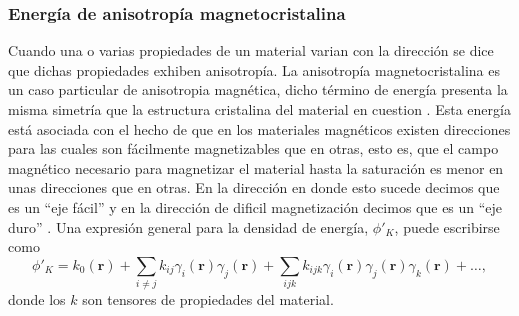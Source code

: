 \subsubsection{Energía de anisotropía magnetocristalina}
Cuando una o varias propiedades de un material varian con la dirección se dice que dichas propiedades exhiben anisotropía. La anisotropía magnetocristalina es un caso particular de anisotropia magnética, dicho término de energía presenta la misma simetría que la estructura cristalina del material en cuestion \cite{KronmüllerMicromagnetism}. Esta energía está asociada con el hecho de que en los materiales magnéticos existen direcciones para las cuales son fácilmente magnetizables que en otras, esto es, que el campo magnético necesario para magnetizar el material hasta la saturación es menor en unas direcciones que en otras. En la dirección en donde esto sucede decimos que es un ``eje fácil'' y en la dirección de dificil magnetización decimos que es un ``eje duro'' \cite{OHandley}. Una expresión general para la densidad de energía, $\phi'_K$, puede escribirse como \cite{birss1964symmetry} 
\begin{equation}
    \phi'_K = k_0 (\mathbf{r}) + \sum_{i \neq j} k_{ij} \gamma_i (\mathbf{r}) \gamma_j(\mathbf{r}) + \sum_{ijk} k_{ijk} \gamma_i (\mathbf{r}) \gamma_j (\mathbf{r}) \gamma_k (\mathbf{r}) + \dotsc,    \label{eq:anisotropy}
\end{equation}
donde los $k$ son tensores de propiedades del material.

\vspace{10pt}

